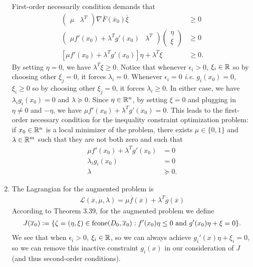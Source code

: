 \documentclass[12pt]{article}
\begin{document}
\begin{problem}[1]
\begin{enumerate}[label=(\alph*)]
First-order necessarily condition demands that
\begin{align*}
	\begin{pmatrix} \mu& \lambda^{T} \end{pmatrix} \nabla \overline{F}(\overline{x}_0) \overline{ \xi} &\geq 0\\
	\begin{pmatrix} \mu f'(x_0) + \lambda^{T}g'(x_0) & \lambda^{T}\end{pmatrix} \begin{pmatrix} \eta\\ \xi \end{pmatrix}  &\geq 0\\
	[\mu f'(x_0) + \lambda^{T}g'(x_0)] \eta + \lambda^{T} \xi &\geq 0.
\end{align*}
By setting $ \eta = 0$, we have $ \lambda^{T} \xi \geq 0$. Notice that whenever $ \epsilon_i > 0$, $ \xi_i \in \mathbb{R}$ so by choosing other $ \xi_j = 0$, it forces $ \lambda_i = 0$. Whenever $ \epsilon_i = 0$ \emph{i.e.} $ g_i(x_0)=0$, $ \xi_i \geq 0$ so by choosing other $ \xi_j =0$, it forces $ \lambda_i \geq 0$. In either case, we have $ \lambda_i g_i(x_0) = 0 $ and $ \lambda \succeq 0$. Since $ \eta \in \mathbb{R}^{n}$, by setting $ \xi = 0$ and plugging in $ \eta \neq 0$ and $ -\eta$, we have $ \mu f'(x_0) + \lambda^{T} g'(x_0) = 0$. This leads to the first-order necessary condition for the inequality constraint optimization problem: if $ x_0 \in \mathbb{R}^{n}$ is a local minimizer of the problem, there exists $ \mu \in \{0,1\} $ and $ \lambda \in \mathbb{R}^{m}$ such that they are not both zero and such that
\begin{align*}
	\mu f'(x_0) + \lambda^{T}g'(x_0) &= 0 \\
	\lambda_i g_i(x_0) &= 0 \\
	\lambda& \succeq 0.
\end{align*}
\item The Lagrangian for the augmented problem is
\begin{align*}
	\mathscr{L}(\overline{x},\mu,\lambda) = \mu \overline{f}(\overline{x}) + \lambda^{T} \overline{g}(\overline{x})
\end{align*}
According to Theorem 3.39, for the augmented problem we define
\begin{align*}
	J(\overline{x}_0):= \{\zeta=(\eta,\xi) \in \operatorname{fcone}( D_0, \overline{x}_0): f'(x_0) \eta \leq 0 \text{ and } g'(x_0) \eta + \xi = 0 \}. 
\end{align*}
We see that when $ \epsilon_i>0$, $ \xi_i \in \mathbb{R}$, so we can always achieve $ g_i'(x)\eta + \xi_i =0$, so we can remove this inactive constraint $ g_i(x)$ in our consideration of $ J$ (and thus second-order conditions). 


\end{enumerate}
\end{problem}
\end{document}
